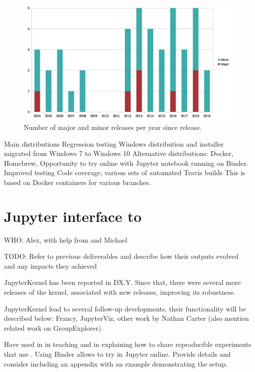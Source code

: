\documentclass{deliverablereport}
\begin{document}
\begin{figure}[!ht]
    \centering
    \includegraphics[width=\textwidth]{images/gap-releases}
    \caption{Number of major and minor \GAP releases per year since  release.}
    \label{fig:gap-releases}
\end{figure}

Main distributions
Regression testing
Windows distribution and installer migrated from Windows 7 to Windows 10
Alternative distributions: Docker, Homebrew, 
Opportunity to try \GAP online with Jupyter notebook running on Binder.
Improved testing
Code coverage, various sets of automated Travis builds
This is based on Docker containers for various branches.

\section{Jupyter interface to \GAP}

WHO: Alex, with help from and Michael

TODO: Refer to previous deliverables and describe how their outputs
evolved and any impacts they achieved

JupyterKernel has been reported in DX.Y. Since that, there were
several more releases of the kernel, associated with new \GAP
releases, improving its robustness. 

JupyterKernel lead to several follow-up developments, their
functionality will be described below: Francy, JupyterViz,
other work by Nathan Carter (also mention related work on
GroupExplorer).

Have used in in teaching and in explaining how to share 
reproducible experiments that use \GAP. Using Binder
allows to try \GAP in Jupyter online. Provide details
and consider including an appendix with an example 
demonstrating the setup.
\end{document}
